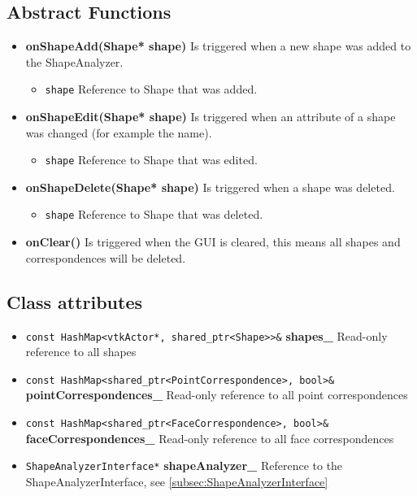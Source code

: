 \subsection{Abstract Functions}

\begin{itemize}
	\item \textbf{onShapeAdd(Shape* shape)} Is triggered when a new shape was added to the ShapeAnalyzer. 
	\begin{itemize}
		\item \texttt{shape} Reference to Shape that was added. 
	\end{itemize}
\end{itemize}

\begin{itemize}
	\item \textbf{onShapeEdit(Shape* shape)} Is triggered when an attribute of a shape was changed (for example the name).
	\begin{itemize}
		\item \texttt{shape} Reference to Shape that was edited. 
	\end{itemize}
\end{itemize}

\begin{itemize}
	\item \textbf{onShapeDelete(Shape* shape)} Is triggered when a shape was deleted.
	\begin{itemize}
		\item \texttt{shape} Reference to Shape that was deleted. 
	\end{itemize}
\end{itemize}

\begin{itemize}
	\item \textbf{onClear()} Is triggered when the GUI is cleared, this means all shapes and correspondences will be deleted.
\end{itemize}

\subsection{Class attributes}
\begin{itemize}
	\item \texttt{const HashMap<vtkActor*, shared\_ptr<Shape>>\&} \textbf{shapes\_} Read-only reference to all shapes
	\item \texttt{const HashMap<shared\_ptr<PointCorrespondence>, bool>\&} \textbf{pointCorrespondences\_} Read-only reference to all point correspondences
	\item \texttt{const HashMap<shared\_ptr<FaceCorrespondence>, bool>\&} \textbf{faceCorrespondences\_} Read-only reference to all face correspondences
	\item \texttt{ShapeAnalyzerInterface*} \textbf{shapeAnalyzer\_} Reference to the ShapeAnalyzerInterface, see \ref{subsec:ShapeAnalyzerInterface}
\end{itemize}

